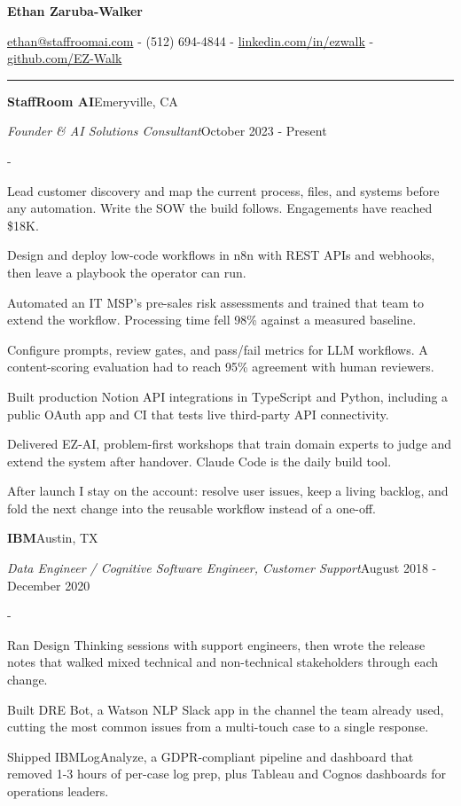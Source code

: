 \documentclass[10pt,letterpaper]{article}
\newenvironment{cvitems}{%
  \begin{list}{-}{%
    \setlength{\leftmargin}{12pt}%
    \setlength{\itemsep}{1.2pt}%
    \setlength{\parsep}{0pt}%
    \setlength{\topsep}{1.5pt}%
    \setlength{\partopsep}{0pt}%
    \setlength{\labelwidth}{6pt}%
    \setlength{\labelsep}{6pt}%
    \setlength{\itemindent}{0pt}%
  }%
}{\end{list}}
\newcommand{\cvsection}[1]{%
  \vspace{7pt}%
  \noindent{\bfseries\fontsize{11pt}{13pt}\selectfont\MakeUppercase{#1}}\par
  \vspace{1pt}%
  \noindent\rule{\textwidth}{0.4pt}\par
  \vspace{4pt}%
}
\newcommand{\cventryhead}[4]{%
  \noindent\textbf{#1}\hfill#2\par
  \vspace{0.5pt}%
  \noindent\textit{#3}\hfill#4\par
}
\begin{document}
\begin{center}
  {\bfseries\fontsize{22pt}{24pt}\selectfont Ethan Zaruba-Walker\par}
  \vspace{4pt}
  {\fontsize{10pt}{12pt}\selectfont
    \href{mailto:ethan@staffroomai.com}{ethan@staffroomai.com}
    {-}
    (512) 694-4844
    {-}
    \href{https://linkedin.com/in/ezwalk}{linkedin.com/in/ezwalk}
    {-}
    \href{https://github.com/EZ-Walk}{github.com/EZ-Walk}\par}
\end{center}
\vspace{2pt}

\cvsection{Experience}

\cventryhead{StaffRoom AI}{Emeryville, CA}
{Founder \& AI Solutions Consultant}{October 2023 - Present}
\begin{cvitems}
  \item Lead customer discovery and map the current process, files, and systems before any automation. Write the SOW the build follows. Engagements have reached \$18K.
  \item Design and deploy low-code workflows in n8n with REST APIs and webhooks, then leave a playbook the operator can run.
  \item Automated an IT MSP's pre-sales risk assessments and trained that team to extend the workflow. Processing time fell 98\% against a measured baseline.
  \item Configure prompts, review gates, and pass/fail metrics for LLM workflows. A content-scoring evaluation had to reach 95\% agreement with human reviewers.
  \item Built production Notion API integrations in TypeScript and Python, including a public OAuth app and CI that tests live third-party API connectivity.
  \item Delivered EZ-AI, problem-first workshops that train domain experts to judge and extend the system after handover. Claude Code is the daily build tool.
  \item After launch I stay on the account: resolve user issues, keep a living backlog, and fold the next change into the reusable workflow instead of a one-off.
\end{cvitems}

\vspace{3pt}
\cventryhead{IBM}{Austin, TX}
{Data Engineer / Cognitive Software Engineer, Customer Support}{August 2018 - December 2020}
\begin{cvitems}
  \item Ran Design Thinking sessions with support engineers, then wrote the release notes that walked mixed technical and non-technical stakeholders through each change.
  \item Built DRE Bot, a Watson NLP Slack app in the channel the team already used, cutting the most common issues from a multi-touch case to a single response.
  \item Shipped IBMLogAnalyze, a GDPR-compliant pipeline and dashboard that removed 1-3 hours of per-case log prep, plus Tableau and Cognos dashboards for operations leaders.
\end{cvitems}
\end{document}
